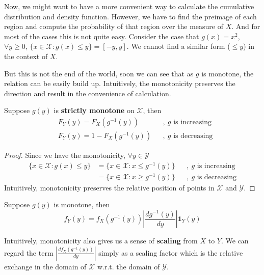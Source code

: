 \documentclass[../Transformation.tex]{subfiles}
\begin{document}
Now, we might want to have a more convenient way to calculate the cumulative distribution and density function. However, we have to find the preimage of each region and compute the probability of that region over the measure of $X$. And for most of the cases this is not quite easy. Consider the case that $g(x) = x^2$, $\forall y\geq 0$, $\{x\in\mathcal{X}:g(x)\leq y \} = [-y,y]$. We cannot find a similar form ($\leq y$) in the context of $X$.

But this is not the end of the world, soon we can see that as $g$ is monotone, the relation can be easily build up. Intuitively, the monotonicity preserves the direction and result in the convenience of calculation.

\begin{property}
	Suppose $g(y)$ is {\bf strictly monotone} on $\mathcal{X}$, then
	\begin{align*}
	&F_Y(y) = F_X(g^{-1}(y))&&,\ g\mbox{ is increasing}\\
	&F_Y(y) = 1- F_X(g^{-1}(y))&&,\ g\mbox{ is decreasing}
	\end{align*}
\end{property}
\begin{proof}
	Since we have the monotonicity, $\forall y\in\mathcal{Y}$
	\begin{align*}
	\{x\in\mathcal{X}: g(x)\leq y \} &= \{x\in\mathcal{X}: x\leq g^{-1}(y) \}&&,\ g\mbox{ is increasing}\\
	&= \{x\in\mathcal{X}: x\geq g^{-1}(y) \}&&,\ g\mbox{ is decreasing}
	\end{align*}
	Intuitively, monotonicity preserves the relative position of points in $\mathcal{X}$ and $\mathcal{Y}$.
\end{proof}

\begin{property}
	Suppose $g(y)$ is monotone, then
	$$f_Y(y) = f_X(g^{-1}(y)) |\frac{dg^{-1}(y)}{dy}| \mathbf{1}_Y(y)$$
\end{property}
Intuitively, monotonicity also gives us a sense of {\bf scaling} from $X$ to $Y$. We can regard the term $|\frac{df_X(g^{-1}(y))}{dy}|$ simply as a scaling factor which is the relative exchange in the domain of $\mathcal{X}$ w.r.t. the domain  of $\mathcal{Y}$.
\end{document}
